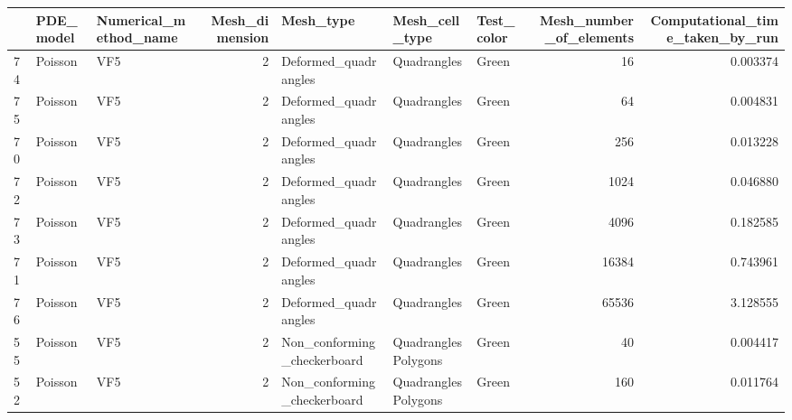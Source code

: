 \begin{tabular}{lllrlllrr}
\toprule
{} &    PDE\_model &             Numerical\_method\_name &  Mesh\_dimension &                       Mesh\_type &         Mesh\_cell\_type & Test\_color &  Mesh\_number\_of\_elements &  Computational\_time\_taken\_by\_run \\
\midrule
74 &      Poisson &                               VF5 &               2 &            Deformed\_quadrangles &           Quadrangles  &      Green &                       16 &                         0.003374 \\
75 &      Poisson &                               VF5 &               2 &            Deformed\_quadrangles &           Quadrangles  &      Green &                       64 &                         0.004831 \\
70 &      Poisson &                               VF5 &               2 &            Deformed\_quadrangles &           Quadrangles  &      Green &                      256 &                         0.013228 \\
72 &      Poisson &                               VF5 &               2 &            Deformed\_quadrangles &           Quadrangles  &      Green &                     1024 &                         0.046880 \\
73 &      Poisson &                               VF5 &               2 &            Deformed\_quadrangles &           Quadrangles  &      Green &                     4096 &                         0.182585 \\
71 &      Poisson &                               VF5 &               2 &            Deformed\_quadrangles &           Quadrangles  &      Green &                    16384 &                         0.743961 \\
76 &      Poisson &                               VF5 &               2 &            Deformed\_quadrangles &           Quadrangles  &      Green &                    65536 &                         3.128555 \\
55 &      Poisson &                               VF5 &               2 &     Non\_conforming\_checkerboard &  Quadrangles Polygons  &      Green &                       40 &                         0.004417 \\
52 &      Poisson &                               VF5 &               2 &     Non\_conforming\_checkerboard &  Quadrangles Polygons  &      Green &                      160 &                         0.011764 \\

\end{tabular}
